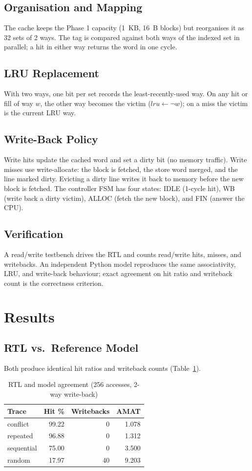 \documentclass[conference]{IEEEtran}
\begin{document}
\subsection{Organisation and Mapping}
The cache keeps the Phase 1 capacity (1~KB, 16~B blocks) but reorganises it as
32 sets of 2 ways. The tag is compared against both ways of the indexed set in
parallel; a hit in either way returns the word in one cycle.

\subsection{LRU Replacement}
With two ways, one bit per set records the least-recently-used way. On any hit
or fill of way $w$, the other way becomes the victim ($lru \leftarrow \lnot w$);
on a miss the victim is the current LRU way.

\subsection{Write-Back Policy}
Write hits update the cached word and set a dirty bit (no memory traffic).
Write misses use write-allocate: the block is fetched, the store word merged,
and the line marked dirty. Evicting a dirty line writes it back to memory
before the new block is fetched. The controller FSM has four states: IDLE
(1-cycle hit), WB (write back a dirty victim), ALLOC (fetch the new block), and
FIN (answer the CPU).

\subsection{Verification}
A read/write testbench drives the RTL and counts read/write hits, misses, and
writebacks. An independent Python model reproduces the same associativity, LRU,
and write-back behaviour; exact agreement on hit ratio and writeback count is
the correctness criterion.

\section{Results}
\subsection{RTL vs.\ Reference Model}
Both produce identical hit ratios and writeback counts (Table~\ref{tab:rtl}).

\begin{table}[htbp]
\caption{RTL and model agreement (256 accesses, 2-way write-back)}
\label{tab:rtl}
\centering
\begin{tabular}{@{}lrrr@{}}
\toprule
\textbf{Trace} & \textbf{Hit \%} & \textbf{Writebacks} & \textbf{AMAT} \\
\midrule
conflict   & 99.22 & 0  & 1.078 \\
repeated   & 96.88 & 0  & 1.312 \\
sequential & 75.00 & 0  & 3.500 \\
random     & 17.97 & 40 & 9.203 \\
\bottomrule
\end{tabular}
\end{table}
\end{document}
